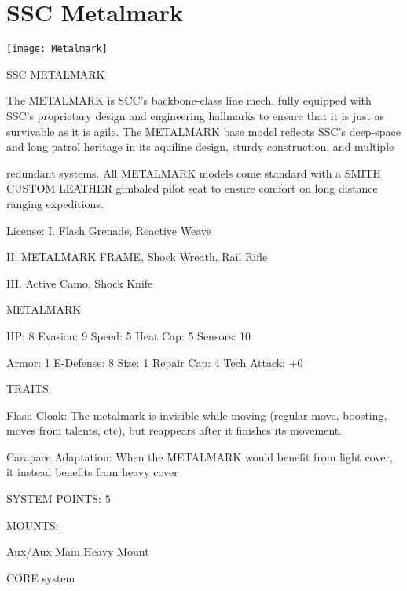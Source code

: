 
\section{SSC Metalmark}

\texttt{[image: Metalmark]}

                                             SSC METALMARK

The METALMARK is SCC’s backbone-class line mech, fully equipped with SSC’s proprietary design and
engineering hallmarks to ensure that it is just as survivable as it is agile. The METALMARK base model
reflects SSC’s deep-space and long patrol heritage in its aquiline design, sturdy construction, and multiple

redundant systems. All METALMARK models come standard with a SMITH CUSTOM LEATHER gimbaled
pilot seat to ensure comfort on long distance ranging expeditions.




                                                     License:
 I. Flash Grenade, Reactive Weave

 II. METALMARK FRAME, Shock Wreath, Rail Rifle

 III. Active Camo, Shock Knife


                                                METALMARK

  HP: 8          Evasion: 9                             Speed: 5            Heat Cap: 5         Sensors: 10

 Armor: 1        E-Defense: 8                           Size: 1             Repair Cap: 4       Tech Attack:
                                                                                                +0

                                                     TRAITS:

  Flash Cloak: The metalmark is invisible while moving (regular move, boosting, moves from talents, etc),
  but reappears after it finishes its movement.

  Carapace Adaptation: When the METALMARK would benefit from light cover, it instead benefits from
  heavy cover

                                              SYSTEM POINTS: 5

                                                    MOUNTS:

 Aux/Aux                             Main                                   Heavy Mount

                                                 CORE system

